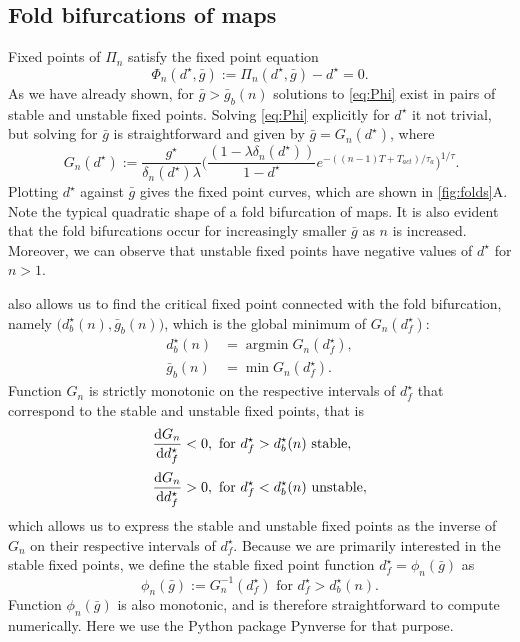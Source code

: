 \subsection{Fold bifurcations of maps}
Fixed points of \(\Pi_n\) satisfy the fixed point equation
\begin{equation}
	\label{eq:Phi}
	\Phi_n(d^\star, \bar g) := \Pi_n(d^\star, \bar g)-d^\star = 0.
\end{equation}
As we have already shown, for \(\bar g > \bar g_b(n)\) solutions to \cref{eq:Phi} exist in pairs of stable and unstable fixed points.
Solving \cref{eq:Phi} explicitly for \(d^\star\) it not trivial, but solving for \(\bar g\) is straightforward and given by \(\bar g= G_n(d^\star)\), where
\begin{equation}
	~\label{eq:g}
	G_{n}(d^{\star}) :=
	\frac{g^{\star}}{\delta_n(d^\star)\lambda}
	\Big(
	\frac{(1-\lambda\delta_n(d^\star)) }{1-d^\star} e^{-((n-1)T + T_{act})/\tau_a}
	\Big)^{1/\tau}.
\end{equation}
Plotting \(d^\star\) against \(\bar g\) gives the fixed point curves, which are shown in \cref{fig:folds}A.
Note the typical quadratic shape of a fold bifurcation of maps.
It is also evident that the fold bifurcations occur for increasingly smaller \(\bar g\) as \(n\) is increased.
Moreover, we can observe that unstable fixed points have negative values of \(d^\star\) for \(n>1\).

 also allows us to find the critical fixed point connected with the fold bifurcation, namely \(\big(d^\star_b(n), \bar g_b(n)\big)\), which is the global minimum
of \(G_n(d^\star_f)\):
\begin{align}
	d^\star_b(n) & = \operatorname{argmin} G_n(d^\star_f), \\
	\bar g_b(n)  & = \min{G_n(d^\star_f)}.
\end{align}
Function \(G_n\) is strictly monotonic on the respective intervals of \(d^\star_f\) that correspond to the stable and unstable fixed points, that is
\begin{align}
	\dv{G_n}{d^\star_f} & < 0, \text{ for } d^\star_f>d^\star_b(n) \text{ stable},   \\[0.5ex]
	\dv{G_n}{d^\star_f} & > 0, \text{ for } d^\star_f<d^\star_b(n) \text{ unstable},
\end{align}
which allows us to express the stable and unstable fixed points as the inverse of \(G_n\) on their respective intervals of \(d^\star_f\).
Because we are primarily interested in the stable fixed points, we define the stable fixed point function \(d^\star_f = \phi_n(\bar g)\) as
\begin{equation}
	\label{eq:phi}
	\phi_n(\bar g):= G_n^{-1}(d^\star_f) \text{ for } d^\star_f>d^\star_b(n).
\end{equation}
Function \(\phi_n(\bar g)\) is also monotonic, and is therefore straightforward to compute numerically.
Here we use the Python package Pynverse \citep{pynverse} for that purpose.

